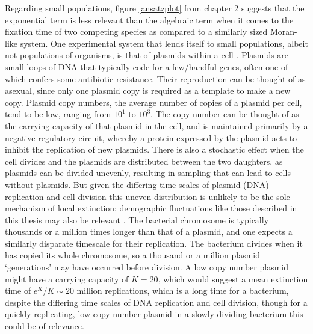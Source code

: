 Regarding small populations, figure \ref{ansatzplot} from chapter 2 suggests that the exponential term is less relevant than the algebraic term when it comes to the fixation time of two competing species as compared to a similarly sized Moran-like system. %
One experimental system that lends itself to small populations, albeit not populations of organisms, is that of plasmids within a cell \cite{Gooding-townsend2015}. 
%
Plasmids are small loops of DNA that typically code for a few/handful genes, often one of which confers some antibiotic resistance\cite{DelSolar1998,Brock2006,VanMelderen2009}. 
Their reproduction can be thought of as asexual, since only one plasmid copy is required as a template to make a new copy. 
Plasmid copy numbers, the average number of copies of a plasmid per cell, tend to be low, ranging from $10^1$ to $10^3$. 
The copy number can be thought of as the carrying capacity of that plasmid in the cell, and is maintained primarily by a negative regulatory circuit, whereby a protein expressed by the plasmid acts to inhibit the replication of new plasmids. 
There is also a stochastic effect when the cell divides and the plasmids are distributed between the two daughters, as plasmids can be divided unevenly, resulting in sampling that can lead to cells without plasmids. 
But given the differing time scales of plasmid (DNA) replication and cell division this uneven distribution is unlikely to be the sole mechanism of local extinction; demographic fluctuations like those described in this thesis may also be relevant \cite{Elowitz2002,McMillen2002}. 
The bacterial chromosome is typically thousands or a million times longer than that of a plasmid, and one expects a similarly disparate timescale for their replication. 
The bacterium divides when it has copied its whole chromosome, so a thousand or a million plasmid `generations' may have occurred before division. 
A low copy number plasmid might have a carrying capacity of $K=20$, which would suggest a mean extinction time of $e^K/K\sim 20$ million replications, which is a long time for a bacterium, despite the differing time scales of DNA replication and cell division, though for a quickly replicating, low copy number plasmid in a slowly dividing bacterium this could be of relevance. 
